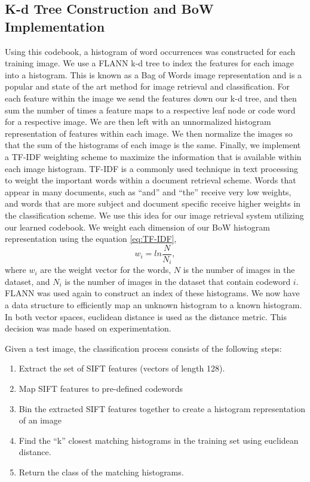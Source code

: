 \subsection{K-d Tree Construction and BoW Implementation}
Using this codebook, a histogram of word occurrences was constructed for each training image. 
We use a FLANN k-d tree to index the features for each image into a histogram.
This is known as a Bag of Words image representation and is a popular and state of the art method for image retrieval and classification.
For each feature within the image we send the features down our k-d tree, and then sum the number of times a feature maps to a respective leaf node or code word for a respective image.
We are then left with an unnormalized histogram representation of features within each image.
We then normalize the images so that the sum of the histograms of each image is the same.
Finally, we implement a TF-IDF weighting scheme to maximize the information that is available within each image histogram.
TF-IDF is a commonly used technique in text processing to weight the important words within a document retrieval scheme.  
Words that appear in many documents, such as ``and'' and ``the'' receive very low weights, and words that are more subject and document specific receive higher weights in the classification scheme.
We use this idea for our image retrieval system utilizing our learned codebook.
We weight each dimension of our BoW histogram representation using the equation \ref{eq:TF-IDF},
\begin{equation}
\label{eq:TF-IDF}
w_{i} = ln\frac{N}{N_{i}},
\end{equation}
where $w_i$ are the weight vector for the words, $N$ is the number of images in the dataset, and $N_i$ is the number of images in the dataset that contain codeword $i$.
FLANN was used again to construct an index of these histograms. 
We now have a data structure to efficiently map an unknown histogram to a known histogram.
In both vector spaces, euclidean distance is used as the distance metric. 
This decision was made based on experimentation.

Given a test image, the classification process consists of the following steps:
\begin{enumerate}
\item Extract the set of SIFT features (vectors of length 128).

\item Map SIFT features to pre-defined codewords

\item Bin the extracted SIFT features together to create a histogram representation of an image

\item Find the ``k'' closest matching histograms in the training set using euclidean distance.

\item Return the class of the matching histograms.
\end{enumerate}




